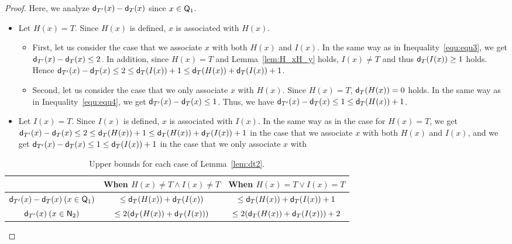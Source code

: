 \begin{proof}
   Here, we analyze $\mathsf{d}_{T'}(x)-\mathsf{d}_T{(x)}$ since $x \in \mathsf{Q}_{\mathrm{1}}$.
   \begin{itemize}
    \item
    Let $H(x) = T$. Since $H(x)$ is defined, $x$ is associated with $H(x)$.
    \begin{itemize}  
     \item First, let us consider the case that we associate $x$ with both $H(x)$ and $I(x)$.
    In the same way as in Inequality~\ref{equ:equ3}, we get $\mathsf{d}_{T'}(x)-\mathsf{d}_T{(x)} \le 2$.
    In addition, since $H(x)=T$ and Lemma~\ref{lem:H_xH_y} holds, $I(x) \neq T$ and thus $\mathsf{d}_{T}(I(x)) \ge 1$ holds.
    Hence $\mathsf{d}_{T'}(x)-\mathsf{d}_T{(x)} \le 2 \le \mathsf{d}_{T}(I(x)) + 1 \le \mathsf{d}_{T}(H(x)) + \mathsf{d}_{T}(I(x)) + 1$.

     \item Second, let us consider the case that we only associate $x$ with $H(x)$.
    Since $H(x)=T$, $\mathsf{d}_{T}(H(x))=0$ holds.
    In the same way as in Inequality~\ref{equ:equ4}, we get $\mathsf{d}_{T'}(x)-\mathsf{d}_T{(x)} \le 1$.
    Thus, we have $\mathsf{d}_{T'}(x)-\mathsf{d}_T{(x)} \le 1 \le \mathsf{d}_{T}(H(x))+1$.
    \end{itemize}

   \item
    Let $I(x) = T$. Since $I(x)$ is defined, $x$ is associated with $I(x)$.
    In the same way as in the case for $H(x)=T$, 
    we get $\mathsf{d}_{T'}(x)-\mathsf{d}_T{(x)} \le 2 \le \mathsf{d}_{T}(H(x)) + 1 \le \mathsf{d}_{T}(H(x)) + \mathsf{d}_{T}(I(x)) +1$ in the case that we associate $x$ with both $H(x)$ and $I(x)$,
    and we get $\mathsf{d}_{T'}(x)-\mathsf{d}_T{(x)} \le 1 \le \mathsf{d}_{T}(I(x))+1$ in the case that we only associate $x$ with
   \end{itemize}
    
    \begin{table}[h]
      \centering
      \caption{Upper bounds for each case of Lemma~\ref{lem:dt2}.} 
      \label{inequality}
      \fontsize{9pt}{10pt}\selectfont
      \begin{tabular}{|c|c|c|} \hline
        & When $H(x) \ne T \land I(x) \ne T$ & When $H(x) = T \lor I(x) = T$ \\ \hline
        $\mathsf{d}_{T'}(x)-\mathsf{d}_T{(x)} \: (x \in \mathsf{Q}_{\mathrm{1}})$ & $\leq \mathsf{d}_T{(H(x))}+\mathsf{d}_T{(I(x))}$ & $\leq \mathsf{d}_T{(H(x))}+\mathsf{d}_T{(I(x))}+1$ \\\hline
        $\mathsf{d}_{T'}(x) \: (x \in \mathsf{N}_{\mathrm{2}})$ & $\leq 2(\mathsf{d}_T{(H(x))}+\mathsf{d}_T{(I(x))})$ & $\leq 2(\mathsf{d}_T{(H(x))}+\mathsf{d}_T{(I(x))})+2$ \\ \hline
      \end{tabular}
    \end{table}


\end{proof}

